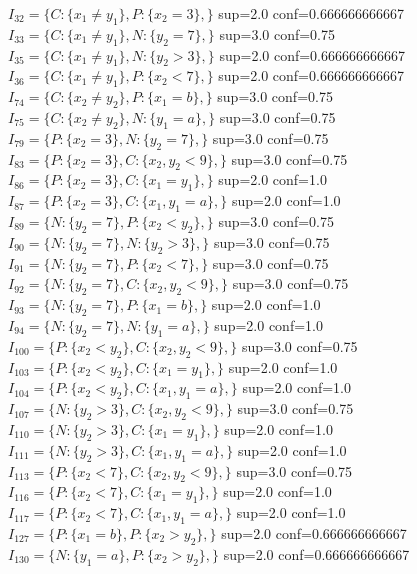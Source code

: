 \documentclass[a4paper,12pt,openany,oneside]{article}
\begin{document}
        $I_{32}=\{C:\{x_{1}\neq y_{1}\},P:\{x_{2}=3\},\}$  sup=2.0 conf=0.666666666667\\
        $I_{33}=\{C:\{x_{1}\neq y_{1}\},N:\{y_{2}=7\},\}$  sup=3.0 conf=0.75\\
        $I_{35}=\{C:\{x_{1}\neq y_{1}\},N:\{y_{2}>3\},\}$  sup=2.0 conf=0.666666666667\\
        $I_{36}=\{C:\{x_{1}\neq y_{1}\},P:\{x_{2}<7\},\}$  sup=2.0 conf=0.666666666667\\
        $I_{74}=\{C:\{x_{2}\neq y_{2}\},P:\{x_{1}=b\},\}$  sup=3.0 conf=0.75\\
        $I_{75}=\{C:\{x_{2}\neq y_{2}\},N:\{y_{1}=a\},\}$  sup=3.0 conf=0.75\\
        $I_{79}=\{P:\{x_{2}=3\},N:\{y_{2}=7\},\}$  sup=3.0 conf=0.75\\
        $I_{83}=\{P:\{x_{2}=3\},C:\{x_{2},y_{2}<9\},\}$  sup=3.0 conf=0.75\\
        $I_{86}=\{P:\{x_{2}=3\},C:\{x_{1}=y_{1}\},\}$  sup=2.0 conf=1.0\\
        $I_{87}=\{P:\{x_{2}=3\},C:\{x_{1},y_{1}=a\},\}$  sup=2.0 conf=1.0\\
        $I_{89}=\{N:\{y_{2}=7\},P:\{x_{2}<y_{2}\},\}$  sup=3.0 conf=0.75\\
        $I_{90}=\{N:\{y_{2}=7\},N:\{y_{2}>3\},\}$  sup=3.0 conf=0.75\\
        $I_{91}=\{N:\{y_{2}=7\},P:\{x_{2}<7\},\}$  sup=3.0 conf=0.75\\
        $I_{92}=\{N:\{y_{2}=7\},C:\{x_{2},y_{2}<9\},\}$  sup=3.0 conf=0.75\\
        $I_{93}=\{N:\{y_{2}=7\},P:\{x_{1}=b\},\}$  sup=2.0 conf=1.0\\
        $I_{94}=\{N:\{y_{2}=7\},N:\{y_{1}=a\},\}$  sup=2.0 conf=1.0\\
        $I_{100}=\{P:\{x_{2}<y_{2}\},C:\{x_{2},y_{2}<9\},\}$  sup=3.0 conf=0.75\\
        $I_{103}=\{P:\{x_{2}<y_{2}\},C:\{x_{1}=y_{1}\},\}$  sup=2.0 conf=1.0\\
        $I_{104}=\{P:\{x_{2}<y_{2}\},C:\{x_{1},y_{1}=a\},\}$  sup=2.0 conf=1.0\\
        $I_{107}=\{N:\{y_{2}>3\},C:\{x_{2},y_{2}<9\},\}$  sup=3.0 conf=0.75\\
        $I_{110}=\{N:\{y_{2}>3\},C:\{x_{1}=y_{1}\},\}$  sup=2.0 conf=1.0\\
        $I_{111}=\{N:\{y_{2}>3\},C:\{x_{1},y_{1}=a\},\}$  sup=2.0 conf=1.0\\
        $I_{113}=\{P:\{x_{2}<7\},C:\{x_{2},y_{2}<9\},\}$  sup=3.0 conf=0.75\\
        $I_{116}=\{P:\{x_{2}<7\},C:\{x_{1}=y_{1}\},\}$  sup=2.0 conf=1.0\\
        $I_{117}=\{P:\{x_{2}<7\},C:\{x_{1},y_{1}=a\},\}$  sup=2.0 conf=1.0\\
        $I_{127}=\{P:\{x_{1}=b\},P:\{x_{2}>y_{2}\},\}$  sup=2.0 conf=0.666666666667\\
        $I_{130}=\{N:\{y_{1}=a\},P:\{x_{2}>y_{2}\},\}$  sup=2.0 conf=0.666666666667\\
        
\end{document}
